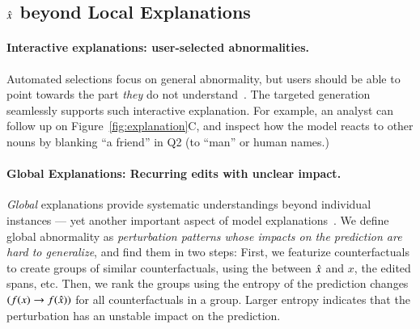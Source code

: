 \subsection{$\hat{x}$ beyond Local Explanations}

\paragraph{Interactive explanations: user-selected abnormalities.}
Automated selections focus on general abnormality, but users should be able to point towards the part \emph{they} do not understand~\cite{miller}.
The targeted generation seamlessly supports such interactive explanation.
For example, an analyst can follow up on Figure~\ref{fig:explanation}C, and inspect how the model reacts to other nouns by blanking ``a friend'' in Q2 (\eg to ``man'' or human names.)


\paragraph{Global Explanations: Recurring edits with unclear impact.}
\label{subsec:global_exp}
\emph{Global} explanations provide systematic understandings beyond individual instances --- yet another important aspect of model explanations~\cite{miller}.
We define global abnormality as \emph{perturbation patterns whose impacts on the prediction are hard to generalize}, and find them in two steps:
First, we featurize counterfactuals to create groups of similar counterfactuals, using the \tagstr between $\hat{x}$ and $x$, the edited spans, etc.
Then, we rank the groups using the entropy of the prediction changes $(f(x) \rightarrow f(\hat{x}))$ for all counterfactuals in a group.
Larger entropy indicates that the perturbation has an unstable impact on the prediction.

